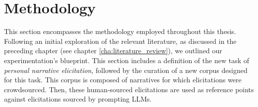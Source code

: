 \chapter{Methodology}
\label{cha:methodology}
This section encompasses the methodology employed throughout this thesis. Following an initial exploration of the relevant literature, as discussed in the preceding chapter (see chapter \ref{cha:literature_review}), we outlined our experimentation's blueprint. %
This section includes a definition of the new task of \emph{personal narrative elicitation}, followed by the curation of a new corpus designed for this task. This corpus is composed of narratives for which elicitations were crowdsourced. Then, these human-sourced elicitations are used as reference points against elicitations sourced by prompting LLMs.
